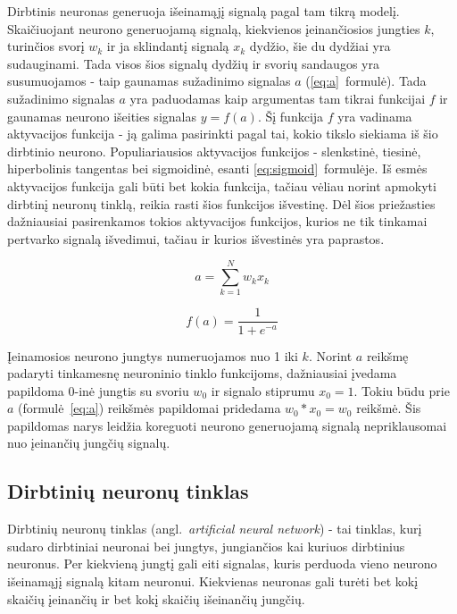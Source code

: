 \documentclass{VUMIFPSbakalaurinis}
\begin{document}
Dirbtinis neuronas generuoja išeinamąjį signalą pagal tam tikrą modelį.
Skaičiuojant neurono generuojamą signalą, kiekvienos įeinančiosios jungties $k$, turinčios svorį $w_k$ ir ja sklindantį signalą $x_k$ dydžio, šie du dydžiai yra sudauginami.
Tada visos šios signalų dydžių ir svorių sandaugos yra susumuojamos - taip gaunamas sužadinimo signalas $a$ (\ref{eq:a}~formulė).
Tada sužadinimo signalas $a$ yra paduodamas kaip argumentas tam tikrai funkcijai $f$ ir gaunamas neurono išeities signalas $y = f(a)$.
Šį funkcija $f$ yra vadinama aktyvacijos funkcija - ją galima pasirinkti pagal tai, kokio tikslo siekiama iš šio dirbtinio neurono.
Populiariausios aktyvacijos funkcijos - slenkstinė, tiesinė, hiperbolinis tangentas bei sigmoidinė, esanti \ref{eq:sigmoid}~formulėje.
Iš esmės aktyvacijos funkcija gali būti bet kokia funkcija, tačiau vėliau norint apmokyti dirbtinį neuronų tinklą, reikia rasti šios funkcijos išvestinę.
Dėl šios priežasties dažniausiai pasirenkamos tokios aktyvacijos funkcijos, kurios ne tik tinkamai pertvarko signalą išvedimui, tačiau ir kurios išvestinės yra paprastos.

\begin{equation} \label{eq:a}
a = \sum_{k=1}^N w_kx_k
\end{equation}

\begin{equation} \label{eq:sigmoid}
f(a) = \frac{1}{1 + e^{-a}}
\end{equation}

Įeinamosios neurono jungtys numeruojamos nuo 1 iki $k$.
Norint $a$ reikšmę padaryti tinkamesnę neuroninio tinklo funkcijoms, dažniausiai įvedama papildoma $0$-inė jungtis su svoriu $w_0$ ir signalo stiprumu $x_0 = 1$.
Tokiu būdu prie $a$ (formulė~\ref{eq:a}) reikšmės papildomai pridedama $w_0 * x_0 = w_0$ reikšmė.
Šis papildomas narys leidžia koreguoti neurono generuojamą signalą nepriklausomai nuo įeinančių jungčių signalų.



\subsection{Dirbtinių neuronų tinklas}

Dirbtinių neuronų tinklas (angl.~\textit{artificial neural network}) - tai tinklas, kurį sudaro dirbtiniai neuronai bei jungtys, jungiančios kai kuriuos dirbtinius neuronus.
Per kiekvieną jungtį gali eiti signalas, kuris perduoda vieno neurono išeinamąjį signalą kitam neuronui.
Kiekvienas neuronas gali turėti bet kokį skaičių įeinančių ir bet kokį skaičių išeinančių jungčių.
\end{document}
